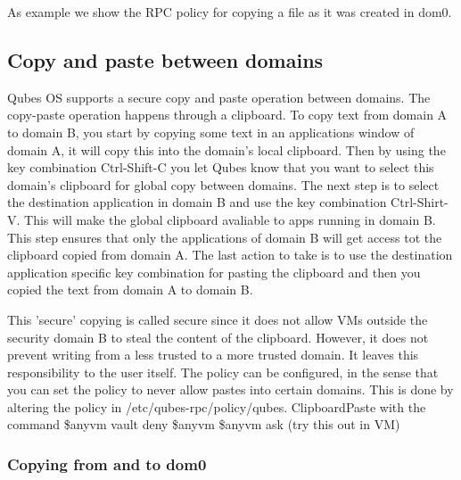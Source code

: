 \documentclass[runningheads,a4paper]{article}
\begin{document}
As example we show the RPC policy for copying a file as it was created
in dom0.

\subsection{Copy and paste between domains} 

Qubes OS supports a secure
copy and paste operation between domains.  The copy-paste operation
happens through a clipboard.  To copy text from domain A to domain B,
you start by copying some text in an applications window of domain A,
it will copy this into the domain's local clipboard.  Then by using
the key combination Ctrl-Shift-C you let Qubes know that you want to
select this domain's clipboard for global copy between domains.  The
next step is to select the destination application in domain B and use
the key combination Ctrl-Shirt-V.  This will make the global clipboard
avaliable to apps running in domain B.  This step ensures that only
the applications of domain B will get access tot the clipboard copied
from domain A.  The last action to take is to use the destination
application specific key combination for pasting the clipboard and
then you copied the text from domain A to domain B.

 This 'secure' copying is called secure since it does not allow VMs
outside the security domain B to steal the content of the clipboard.
However, it does not prevent writing from a less trusted to a more
trusted domain.  It leaves this responsibility to the user itself.
The policy can be configured, in the sense that you can set the policy
to never allow pastes into certain domains.  This is done by altering
the policy in /etc/qubes-rpc/policy/qubes. ClipboardPaste with the
command \$anyvm vault deny \$anyvm \$anyvm ask (try this out in VM)

\subsubsection{Copying from and to dom0} 
\end{document}
